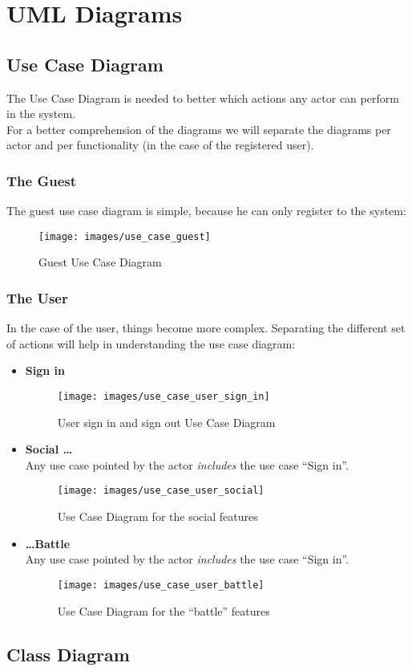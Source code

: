\chapter{UML Diagrams}
	\section{Use Case Diagram}
	The Use Case Diagram is needed to better which actions any actor can perform in the  system.\\
	For a better comprehension of the diagrams we will separate the diagrams per actor and per functionality (in the case of the registered user).

		\subsection{The Guest}
		The guest use case diagram is simple, because he can only register to the system:
		\begin{figure}[ht!]
			\centering
			\texttt{[image: images/use\_case\_guest]}
			\caption{Guest Use Case Diagram}
			\label{fig:use_case_guest}
		\end{figure}

		\subsection{The User}
		In the case of the user, things become more complex. Separating the different set of actions will help in understanding the use case diagram:
		\begin{itemize}
		 	\item \textbf{Sign in}
			\begin{figure}[ht!]
				\centering
				\texttt{[image: images/use\_case\_user\_sign\_in]}
				\caption{User sign in and sign out Use Case Diagram}
				\label{fig:use_case_user_sign_in}
			\end{figure}

			\item \textbf{Social \ldots} \hfill \\
			Any use case pointed by the actor \textit{includes} the use case ``Sign in''.
			\begin{figure}[ht!]
				\centering
				\texttt{[image: images/use\_case\_user\_social]}
				\caption{Use Case Diagram for the social features}
				\label{fig:use_case_user_social}
			\end{figure}

			\item \textbf{\ldots Battle} \hfill \\
			Any use case pointed by the actor \textit{includes} the use case ``Sign in''.
			\begin{figure}[ht!]
				\centering
				\texttt{[image: images/use\_case\_user\_battle]}
				\caption{Use Case Diagram for the ``battle'' features}
				\label{fig:use_case_user_battle}
			\end{figure}
		\end{itemize} 

	\section{Class Diagram}